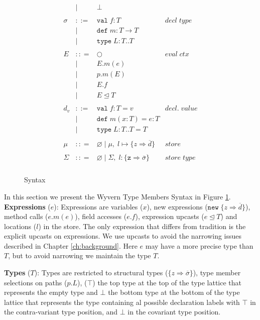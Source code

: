 \documentclass[11pt
              , a4paper
              , twoside
              , openright
              ]{report}
\numberwithin{case}{theorem}
\numberwithin{subcase}{case}
\begin{document}
\begin{figure}[t]
\[\begin{array}{lll}
\begin{array}{lllr}
& | & \bot & \\
&&\\
\sigma & ::= & \texttt{val} \; f:T & decl \; type\\
       & |   & \texttt{def} \; m:T \rightarrow T \\
		 & |   & \texttt{type} \; L : T .. T &\\
&&\\
E & :: = & \bigcirc & eval \; ctx\\
       & | & E.m(e)\\
       & | & p.m(E)\\
       & | & E.f\\
       & | & E \unlhd T\\
&&\\
d_v & ::= & \texttt{val} \; f : T = v & decl. \; value \\
  & |   & \texttt{def} \; m(x:T) = e : T &\\
  & |   & \texttt{type} \; L : T .. T = T &\\
&&\\
\mu & :: = & \varnothing \; | \; \mu,\; l \mapsto \{z \Rightarrow \overline{d}\} & store \\
&&\\
\Sigma & :: = & \varnothing \; | \; \Sigma,\; l : \{\texttt{z} \Rightarrow \overline{\sigma}\} & store \; type \\
\end{array}
\end{array}
\]
\caption{Syntax}
\label{f:syntax}
\end{figure}


In this section we present the Wyvern Type Members Syntax 
in Figure \ref{f:syntax}. 
\textbf{Expressions} ($e$): Expressions are variables ($x$), new 
expressions ($\texttt{new} \; \{z \Rightarrow \overline{d}\}$), 
method calls ($e.m(e)$), field accesses ($e.f$), expression 
upcasts ($e \unlhd T$) and locations ($l$) in the store. The 
only expression that differs from tradition is the explicit upcasts on expressions. 
We use upcasts to avoid the narrowing issues described in Chapter \ref{ch:background}.
 Here $e$ may have a more precise 
type than $T$, but to avoid narrowing we maintain the type $T$.

\textbf{Types} ($T$): Types are restricted to structural types 
($\{z \Rightarrow \overline{\sigma}\}$), type member selections on 
paths ($p.L$), ($\top$) the top type at the top of the type lattice 
that represents the empty type and $\bot$ the bottom type at the 
bottom of the type lattice that represents the type containing 
al possible declaration labels with $\top$ in the contra-variant 
type position, and $\bot$ in the covariant type position.
\end{document}
